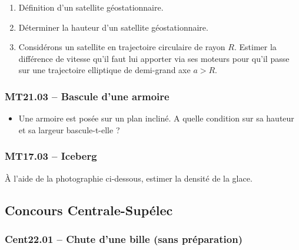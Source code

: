 \begin{enumerate}
    \item Définition d'un satellite géostationnaire.
    \item Déterminer la hauteur d'un satellite géostationnaire.
    \item Considérons un satellite en trajectoire circulaire de rayon $R$. Estimer la différence de vitesse qu'il faut lui apporter via ses moteurs pour qu'il passe sur une trajectoire elliptique de demi-grand axe $a > R$.
\end{enumerate}



\subsubsection*{MT21.03 -- Bascule d'une armoire  \corrige}

\begin{itemize}[label=\textbullet]
    \item Une armoire est posée sur un plan incliné. A quelle condition sur sa hauteur et sa largeur bascule-t-elle ?
\end{itemize}

\subsubsection*{MT17.03 -- Iceberg }

À l'aide de la photographie ci-dessous, estimer la densité de la glace.
\begin{center}
\end{center}

\newpage
\subsection*{Concours Centrale-Supélec}
\subsubsection*{Cent22.01 -- Chute d'une bille (sans préparation)  \corrige}

